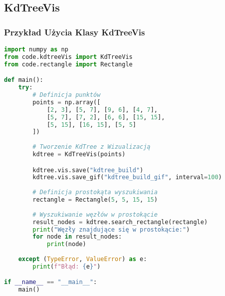 \documentclass[12pt]{article}
\begin{document}
\subsection{KdTreeVis}
\subsubsection{Przykład Użycia Klasy KdTreeVis}
\begin{lstlisting}[language=Python, caption=Przykład użycia klasy KdTreeVis, style=examplestyle]
import numpy as np
from code.kdtreeVis import KdTreeVis
from code.rectangle import Rectangle

def main():
    try:
        # Definicja punktów
        points = np.array([
            [2, 3], [5, 7], [9, 6], [4, 7],
            [5, 7], [7, 2], [6, 6], [15, 15],
            [5, 15], [16, 15], [5, 5]
        ])
        
        # Tworzenie KdTree z Wizualizacją
        kdtree = KdTreeVis(points)

        kdtree.vis.save("kdtree_build")
        kdtree.vis.save_gif("kdtree_build_gif", interval=100)
        
        # Definicja prostokąta wyszukiwania
        rectangle = Rectangle(5, 5, 15, 15)
        
        # Wyszukiwanie węzłów w prostokącie
        result_nodes = kdtree.search_rectangle(rectangle)
        print("Węzły znajdujące się w prostokącie:")
        for node in result_nodes:
            print(node)
        
    except (TypeError, ValueError) as e:
        print(f"Błąd: {e}")

if __name__ == "__main__":
    main()
\end{lstlisting}
\end{document}
